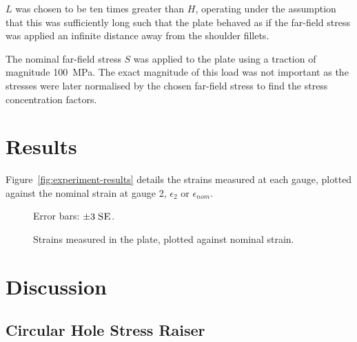 \documentclass[a4paper,11pt,twocolumn]{article}
\newcommand{\SE}{\textsc{SE}\xspace}
\newcommand{\MPa}{\si{\mega\pascal}\xspace}
\begin{document}
$L$ was chosen to be ten times greater than $H$, operating under the assumption
that this was sufficiently long such that the plate behaved as if the far-field stress was applied an infinite distance away from the shoulder fillets.

The nominal far-field stress $S$ was applied to the plate using a traction of
magnitude 100~\MPa. The exact magnitude of this load was not important as
the stresses were later normalised by the chosen far-field stress to find the 
stress concentration factors.

\section{Results}

Figure~\vref{fig:experiment-results} details the strains measured at each gauge,
plotted against the nominal strain at gauge 2, $\epsilon_2$ or $\epsilon_{nom}$.

\begin{figure}[h]
    \centering
    \def\svgwidth{0.48\textwidth}
    
    \begin{footnotesize}
        Error bars: $\pm3\;\text{\SE}$.
    \end{footnotesize}
    \caption{Strains measured in the plate, plotted against nominal strain.}
    \label{fig:experiment-results}
\end{figure}

\section{Discussion}

\subsection{Circular Hole Stress Raiser}
\end{document}
